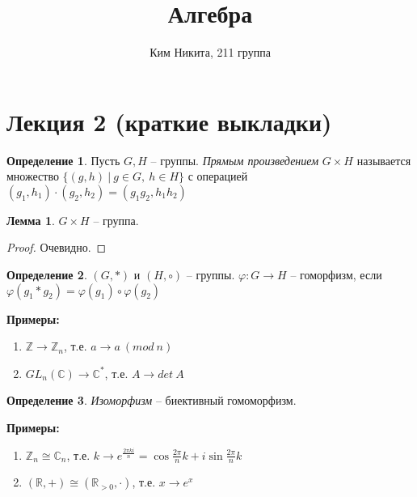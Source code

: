 \documentclass[a4paper, 12pt]{article}
\title{\textbf{Алгебра}}
\author{Ким Никита, 211 группа}
\theoremstyle{definition}
\newtheorem*{definition}{Определение}
\newtheorem*{lemma}{Лемма}
\begin{document}
\fontsize{14pt}{20pt}\selectfont
    \maketitle
    \newpage
    \tableofcontents
    \fontsize{14pt}{20pt}\selectfont
    \newpage
    
    \section{Лекция 2 (краткие выкладки)}
    \begin{definition}
        Пусть $G,H$ -- группы. \textit{Прямым произведением} $G\times H$ называется множество $\{(g,h)\ |\ g \in G,\ h \in H\}$ с операцией $(g_1, h_1)\cdot (g_2,h_2) = (g_1g_2, h_1h_2)$   
    \end{definition}

    \begin{lemma}
        $G\times H$ -- группа.
    \end{lemma}
    \begin{proof}
        Очевидно.
    \end{proof}

    \begin{definition}
        $(G, *)$ и $(H, \circ)$ -- группы. $\varphi: G \longrightarrow H$ -- гоморфизм, если $\varphi(g_1 * g_2) = \varphi(g_1)\circ \varphi(g_2)$   
    \end{definition}

    \textbf{Примеры:}
    \begin{enumerate}
        \item $\mathbb{Z} \longrightarrow \mathbb{Z}_n$, т.е. $a \to a\ (mod\ n)$  
        \item $GL_n(\mathbb{C}) \longrightarrow \mathbb{C}^*$, т.е. $A \to det\ A$ 
    \end{enumerate}
     
    \begin{definition}
        \textit{Изоморфизм} -- биективный гомоморфизм. 
    \end{definition}
    
    \textbf{Примеры:}
    \begin{enumerate}
        \item $\mathbb{Z}_n \cong \mathbb{C}_n$, т.е. $k \to e^{\frac{2\pi ki}{n}} = \cos \frac{2\pi}{n}k + i\sin \frac{2\pi}{n}k$
        \item $(\mathbb{R}, +) \cong (\mathbb{R}_{>0}, \cdot)$, т.е. $x \to e^x$   
    \end{enumerate}
\end{document}

